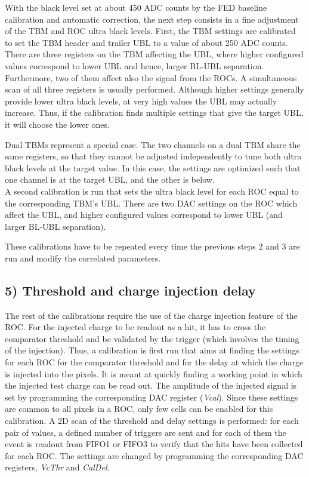 With the black level set at about 450 ADC counts by the FED baseline calibration and automatic correction, the next step consists in a fine adjustment of the TBM and ROC ultra black levels.
First, the TBM settings are calibrated to set the TBM header and trailer UBL to a value of about 250 ADC counts.
There are three registers on the TBM affecting the UBL, where higher configured values correspond to lower UBL and hence, larger BL-UBL separation. Furthermore, two of them affect also the signal from the ROCs.
A simultaneous scan of all three registers is usually performed.
Although higher settings generally provide lower ultra black levels, at very high values the UBL may actually increase. 
Thus, if the calibration finds multiple settings that give the target UBL, it will choose the lower ones.

Dual TBMs represent a special case. The two channels on a dual TBM share the same registers, so that they cannot be adjusted independently to tune both ultra black levels at the target value.
In this case, the settings are optimized such that one channel is at the target UBL, and the other is below.\\

A second calibration is run that sets the ultra black level for each ROC equal to the corresponding TBM's UBL.
There are two DAC settings on the ROC which affect the UBL, and higher configured values correspond to lower UBL (and larger BL-UBL separation).

These calibrations have to be repeated every time the previous steps 2 and 3 are run and modify the correlated parameters.

\subsection*{5) Threshold and charge injection delay}

The rest of the calibrations require the use of the charge injection feature of the ROC.
For the injected charge to be readout as a hit, it has to cross the comparator threshold and be validated by the trigger (which involves the timing of the injection).
Thus, a calibration is first run that aims at finding the settings for each ROC for the comparator threshold and for the delay at which the charge is injected into the pixels.
It is meant at quickly finding a working point in which the injected test charge can be read out.
The amplitude of the injected signal is set by programming the corresponding DAC register (\textit{Vcal}).
Since these settings are common to all pixels in a ROC, only few cells can be enabled for this calibration.
A 2D scan of the threshold and delay settings is performed: for each pair of values, a defined number of triggers are sent and for each of them the event is readout from FIFO1 or FIFO3 to verify that the hits have been collected for each ROC. The settings are changed by programming the corresponding DAC registers, \textit{VcThr} and \textit{CalDel}.

